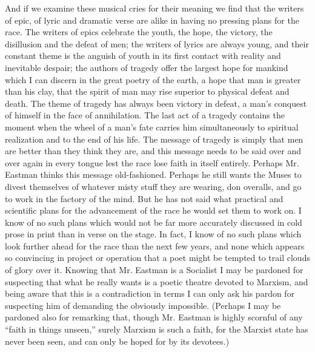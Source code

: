 \documentclass[9pt,twoside]{extarticle}
\begin{document}
And if we examine these musical cries for their meaning we find that the writers of epic, of lyric and dramatic verse are alike in having no pressing plans for the race. The writers of epics celebrate the youth, the hope, the victory, the disillusion and the defeat of men; the writers of lyrics are always young, and their constant theme is the anguish of youth in its first contact with reality and inevitable despair; the authors of tragedy offer the largest hope for mankind which I can discern in the great poetry of the earth, a hope that man is greater than his clay, that the spirit of man may rise superior to physical defeat and death. The theme of tragedy has always been victory in defeat, a man's conquest of himself in the face of annihilation. The last act of a tragedy contains the moment when the wheel of a man's fate carries him simultaneously to spiritual realization and to the end of his life. The message of tragedy is simply that men are better than they think they are, and this message needs to be said over and over again in every tongue lest the race lose faith in itself entirely. Perhaps Mr. Eastman thinks this message old-fashioned. Perhaps he still wants the Muses to divest themselves of whatever misty stuff they are wearing, don overalls, and go to work in the factory of the mind. But he has not said what practical and scientific plans for the advancement of the race he would set them to work on. I know of no such plans which would not be far more accurately discussed in cold prose in print than in verse on the stage. In fact, I know of no such plans which look further ahead for the race than the next few years, and none which appears so convincing in project or operation that a poet might be tempted to trail clouds of glory over it. Knowing that Mr. Eastman is a Socialist I may be pardoned for suspecting that what he really wants is a poetic theatre devoted to Marxism, and being aware that this is a contradiction in terms I can only ask his pardon for suspecting him of demanding the obviously impossible. (Perhaps I may be pardoned also for remarking that, though Mr. Eastman is highly scornful of any ``faith in things unseen,'' surely Marxism is such a faith, for the Marxist state has never been seen, and can only be hoped for by its devotees.)
\end{document}
